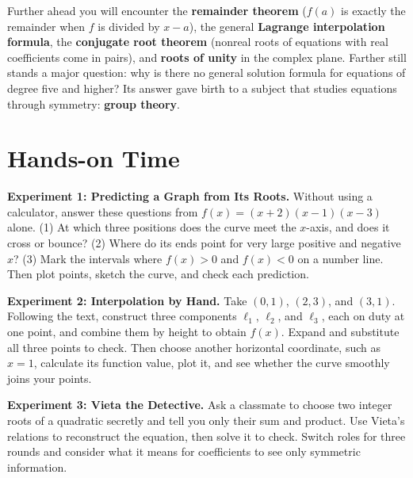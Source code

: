 \begin{pandeng}
Further ahead you will encounter the \textbf{remainder theorem} ($f(a)$ is exactly the remainder when $f$ is divided by $x-a$), the general \textbf{Lagrange interpolation formula}, the \textbf{conjugate root theorem} (nonreal roots of equations with real coefficients come in pairs), and \textbf{roots of unity} in the complex plane. Farther still stands a major question: why is there no general solution formula for equations of degree five and higher? Its answer gave birth to a subject that studies equations through symmetry: \textbf{group theory}.
\end{pandeng}

\section{Hands-on Time}

\begin{shiyan}
\textbf{Experiment 1: Predicting a Graph from Its Roots.} Without using a calculator, answer these questions from $f(x)=(x+2)(x-1)(x-3)$ alone. (1) At which three positions does the curve meet the $x$-axis, and does it cross or bounce? (2) Where do its ends point for very large positive and negative $x$? (3) Mark the intervals where $f(x)>0$ and $f(x)<0$ on a number line. Then plot points, sketch the curve, and check each prediction.

\textbf{Experiment 2: Interpolation by Hand.} Take $(0,1)$, $(2,3)$, and $(3,1)$. Following the text, construct three components $\ell_1$, $\ell_2$, and $\ell_3$, each on duty at one point, and combine them by height to obtain $f(x)$. Expand and substitute all three points to check. Then choose another horizontal coordinate, such as $x=1$, calculate its function value, plot it, and see whether the curve smoothly joins your points.

\textbf{Experiment 3: Vieta the Detective.} Ask a classmate to choose two integer roots of a quadratic secretly and tell you only their sum and product. Use Vieta's relations to reconstruct the equation, then solve it to check. Switch roles for three rounds and consider what it means for coefficients to see only symmetric information.
\end{shiyan}

